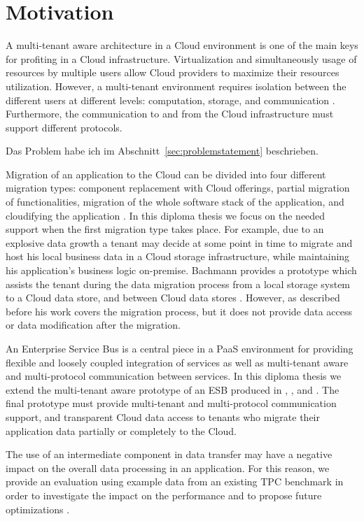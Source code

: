 \section{Motivation}
\label{sec:Motivation}     

A multi-tenant aware architecture in a Cloud environment is one of the main keys for profiting in a Cloud infrastructure. Virtualization and simultaneously usage of resources by multiple users allow Cloud providers to maximize their resources utilization. However, a multi-tenant environment requires isolation between the different users at different levels: computation, storage, and communication \cite{EnablingMT}. Furthermore, the communication to and from the Cloud infrastructure must support different protocols. 

Das Problem habe ich im Abschnitt~\ref{sec:problemstatement} beschrieben.

Migration of an application to the Cloud can be divided into four different migration types: component replacement with Cloud offerings, partial migration of functionalities, migration of the whole software stack of the application, and cloudifying the application \cite{andrikopoulos2013}. In this diploma thesis we focus on the needed support when the first migration type takes place. For example, due to an explosive data growth a tenant may decide at some point in time to migrate and host his local business data in a Cloud storage infrastructure, while maintaining his application's business logic on-premise. Bachmann provides a prototype which assists the tenant during the data migration process from a local storage system to a Cloud data store, and between Cloud data stores \cite{bachmann2012}. However, as described before his work covers the migration process, but it does not provide data access or data modification after the migration. 

An Enterprise Service Bus is a central piece in a \ac{PaaS} environment for providing flexible and loosely coupled integration of services as well as multi-tenant aware and multi-protocol communication between services. In this diploma thesis we extend the multi-tenant aware prototype of an \ac{ESB} produced in \cite{Muhler2012}, \cite{Essl2011}, and \cite{gomez2012}. The final prototype must provide multi-tenant and multi-protocol communication support, and transparent Cloud data access to tenants who migrate their application data partially or completely to the Cloud. 

The use of an intermediate component in data transfer may have a negative impact on the overall data processing in an application. For this reason, we provide an evaluation using example data from an existing TPC benchmark in order to investigate the impact on the performance and to propose future optimizations \cite{tcpbenchmark}.